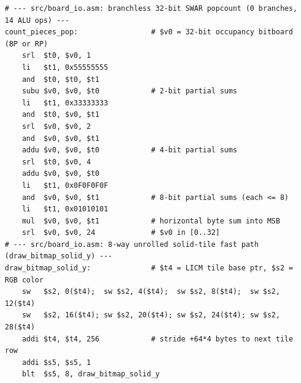 \vspace{0.3cm}
\begin{lstlisting}[style=mipsstyle, caption={Deployed production MIPS32 branchless SWAR Hamming weight (\code{count\_pieces}, \code{src/board\_io.asm:161--187}, \emph{Hacker's Delight} \S 5-1 (Warren, \emph{Hacker's Delight}, Sec.~5-1)) and 8-way unrolled solid-tile renderer (\code{src/board\_io.asm:667--678}).}, label={lst:popcnt_unroll}]
# --- src/board_io.asm: branchless 32-bit SWAR popcount (0 branches, 14 ALU ops) ---
count_pieces_pop:                 # $v0 = 32-bit occupancy bitboard (BP or RP)
    srl  $t0, $v0, 1
    li   $t1, 0x55555555
    and  $t0, $t0, $t1
    subu $v0, $v0, $t0            # 2-bit partial sums
    li   $t1, 0x33333333
    and  $t0, $v0, $t1
    srl  $v0, $v0, 2
    and  $v0, $v0, $t1
    addu $v0, $v0, $t0            # 4-bit partial sums
    srl  $t0, $v0, 4
    addu $v0, $v0, $t0
    li   $t1, 0x0F0F0F0F
    and  $v0, $v0, $t1            # 8-bit partial sums (each <= 8)
    li   $t1, 0x01010101
    mul  $v0, $v0, $t1            # horizontal byte sum into MSB
    srl  $v0, $v0, 24             # $v0 in [0..32]
# --- src/board_io.asm: 8-way unrolled solid-tile fast path (draw_bitmap_solid_y) ---
draw_bitmap_solid_y:              # $t4 = LICM tile base ptr, $s2 = RGB color
    sw   $s2, 0($t4);  sw $s2, 4($t4);  sw $s2, 8($t4);  sw $s2, 12($t4)
    sw   $s2, 16($t4); sw $s2, 20($t4); sw $s2, 24($t4); sw $s2, 28($t4)
    addi $t4, $t4, 256            # stride +64*4 bytes to next tile row
    addi $s5, $s5, 1
    blt  $s5, 8, draw_bitmap_solid_y
\end{lstlisting}
